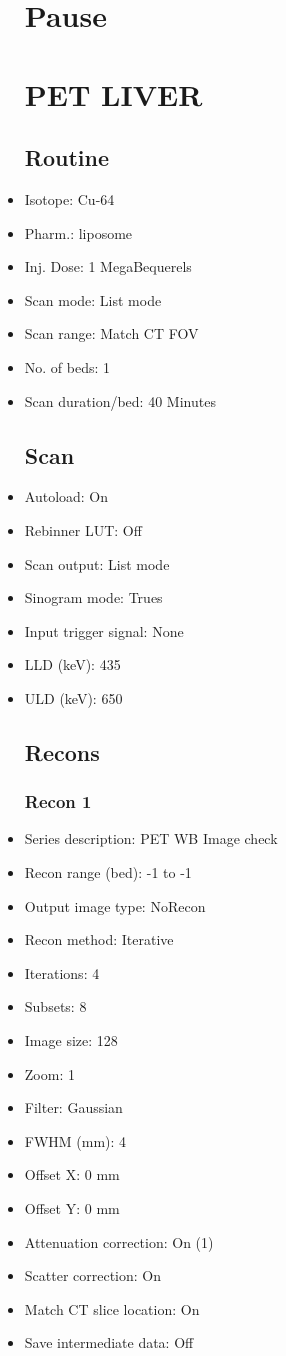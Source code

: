 \documentclass[12pt]{article}
\begin{document}
\begin{itemize}
\section{Pause}
\section{PET LIVER}\subsection{Routine}
\item Isotope: Cu-64
\item Pharm.: liposome
\item Inj. Dose: 1 MegaBequerels
\item Scan mode: List mode
\item Scan range: Match CT FOV
\item No. of beds: 1
\item Scan duration/bed: 40 Minutes
\subsection{Scan}
\item Autoload: On
\item Rebinner LUT: Off
\item Scan output: List mode
\item Sinogram mode: Trues
\item Input trigger signal: None
\item LLD (keV): 435
\item ULD (keV): 650
\subsection{Recons}
\subsubsection{Recon 1}
\item Series description: PET WB Image check
\item Recon range (bed): -1 to -1
\item Output image type: NoRecon
\item Recon method: Iterative
\item Iterations: 4
\item Subsets: 8
\item Image size: 128
\item Zoom: 1
\item Filter: Gaussian
\item FWHM (mm): 4
\item Offset X: 0 mm
\item Offset Y: 0 mm
\item Attenuation correction: On (1)
\item Scatter correction: On
\item Match CT slice location: On
\item Save intermediate data: Off

\end{itemize}
\end{document}

